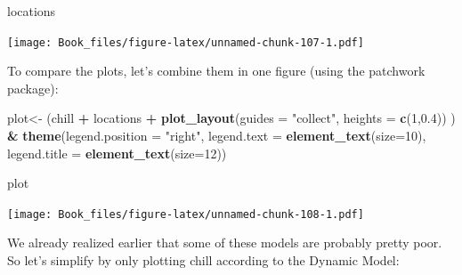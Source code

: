 \documentclass[
]{book}
\newenvironment{Shaded}{\begin{snugshade}}{\end{snugshade}}
\newcommand{\DataTypeTok}[1]{\textcolor[rgb]{0.13,0.29,0.53}{#1}}
\newcommand{\DecValTok}[1]{\textcolor[rgb]{0.00,0.00,0.81}{#1}}
\newcommand{\FloatTok}[1]{\textcolor[rgb]{0.00,0.00,0.81}{#1}}
\newcommand{\KeywordTok}[1]{\textcolor[rgb]{0.13,0.29,0.53}{\textbf{#1}}}
\newcommand{\NormalTok}[1]{#1}
\newcommand{\OperatorTok}[1]{\textcolor[rgb]{0.81,0.36,0.00}{\textbf{#1}}}
\newcommand{\StringTok}[1]{\textcolor[rgb]{0.31,0.60,0.02}{#1}}
\begin{document}
\begin{Shaded}
\begin{Highlighting}[]
\NormalTok{locations}
\end{Highlighting}
\end{Shaded}

\texttt{[image: Book\_files/figure-latex/unnamed-chunk-107-1.pdf]}

To compare the plots, let's combine them in one figure (using the patchwork package):

\begin{Shaded}
\begin{Highlighting}[]
\NormalTok{  plot<-}\StringTok{ }\NormalTok{(chill }\OperatorTok{+}
\StringTok{            }\NormalTok{locations }\OperatorTok{+}
\StringTok{            }\KeywordTok{plot_layout}\NormalTok{(}\DataTypeTok{guides =} \StringTok{"collect"}\NormalTok{,}
                        \DataTypeTok{heights =} \KeywordTok{c}\NormalTok{(}\DecValTok{1}\NormalTok{,}\FloatTok{0.4}\NormalTok{))}
\NormalTok{        ) }\OperatorTok{&}\StringTok{ }\KeywordTok{theme}\NormalTok{(}\DataTypeTok{legend.position =} \StringTok{"right"}\NormalTok{,}
                  \DataTypeTok{legend.text =} \KeywordTok{element_text}\NormalTok{(}\DataTypeTok{size=}\DecValTok{10}\NormalTok{),}
                  \DataTypeTok{legend.title =} \KeywordTok{element_text}\NormalTok{(}\DataTypeTok{size=}\DecValTok{12}\NormalTok{))}

\NormalTok{plot}
\end{Highlighting}
\end{Shaded}

\texttt{[image: Book\_files/figure-latex/unnamed-chunk-108-1.pdf]}

We already realized earlier that some of these models are probably pretty poor. So let's simplify by only plotting chill according to the Dynamic Model:
\end{document}
